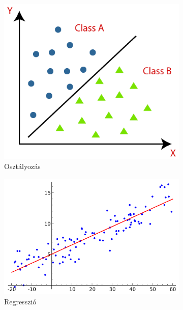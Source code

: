 \begin{figure}[h]
    \centering
    \begin{subfigure}{0.3\textwidth}
        \includegraphics[width=0.8\linewidth]{images/2.fejezet/osztalyozas.png} 
        \caption{Osztályozás}
        \label{fig:osztalyozas}
    \end{subfigure}
    \begin{subfigure}{0.3\textwidth}
        \includegraphics[width=1\linewidth]{images/2.fejezet/regresszio.png}
        \caption{Regresszió}
        \label{fig:regresszio}
    \end{subfigure}
    \begin{subfigure}{0.3\textwidth}

\end{subfigure}
\end{figure}
